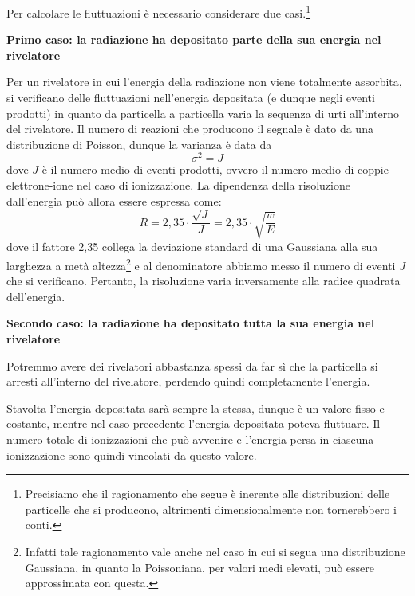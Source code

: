 Per calcolare le fluttuazioni è necessario considerare due casi.\footnote{Precisiamo che il ragionamento che segue è inerente alle distribuzioni delle particelle che si producono, altrimenti dimensionalmente non tornerebbero i conti.}

\textbf{Primo caso: la radiazione ha depositato parte della sua energia nel rivelatore}

Per un rivelatore in cui l'energia della radiazione non viene totalmente assorbita, si verificano delle fluttuazioni nell'energia depositata (e dunque negli eventi prodotti) in quanto da particella a particella varia la sequenza di urti all'interno del rivelatore. Il numero di reazioni che producono il segnale è dato da una distribuzione di Poisson, dunque la varianza è data da
\begin{equation*}
   \sigma^2 = J
\end{equation*}
dove $J$ è il numero medio di eventi prodotti, ovvero il numero medio di coppie elettrone-ione nel caso di ionizzazione. La dipendenza della risoluzione dall'energia può allora essere espressa come:
\begin{equation*}
   R
   =2,35 \cdot \frac{\sqrt{J}}{J}
   =2,35 \cdot \sqrt{\frac{w}{E}}
\end{equation*}
dove il fattore 2,35 collega la deviazione standard di una Gaussiana alla sua larghezza a metà altezza\footnote{Infatti tale ragionamento vale anche nel caso in cui si segua una distribuzione Gaussiana, in quanto la Poissoniana, per valori medi elevati, può essere approssimata con questa.} e al denominatore abbiamo messo il numero di eventi $J$ che si verificano. Pertanto, la risoluzione varia inversamente alla radice quadrata dell'energia.

\vspace{0.2cm}\textbf{Secondo caso: la radiazione ha depositato tutta la sua energia nel rivelatore}

Potremmo avere dei rivelatori abbastanza spessi da far sì che la particella si arresti all'interno del rivelatore, perdendo quindi completamente l'energia.

Stavolta l'energia depositata sarà sempre la stessa, dunque è un valore fisso e costante, mentre nel caso precedente l'energia depositata poteva fluttuare. Il numero totale di ionizzazioni che può avvenire e l'energia persa in ciascuna ionizzazione sono quindi vincolati da questo valore.

